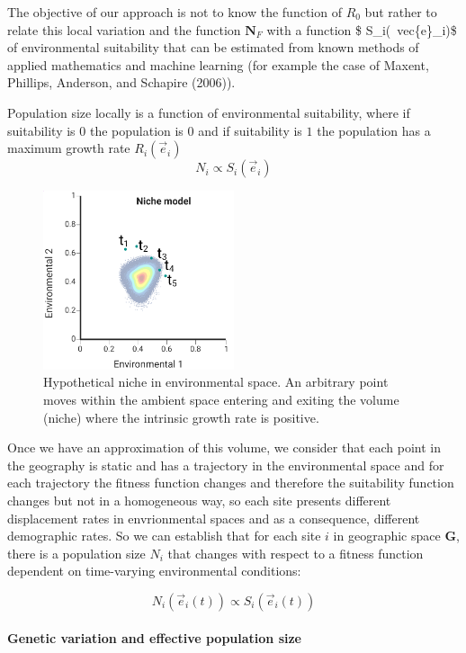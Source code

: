 \documentclass[
]{article}
\begin{document}
The objective of our approach is not to know the function of \(R_0\) but
rather to relate this local variation and the function \(\mathbf{N}_F\)
with a function \$ S\_i(~vec\{e\}\_i)\$ of environmental suitability
that can be estimated from known methods of applied mathematics and
machine learning (for example the case of Maxent, Phillips, Anderson,
and Schapire (2006)).

Population size locally is a function of environmental suitability,
where if suitability is \(0\) the population is \(0\) and if suitability
is \(1\) the population has a maximum growth rate \(R_i(\vec{e}_i)\) \[
N_i \propto  S_i(\vec{e}_i)
\]

\begin{figure}
\centering
\includegraphics[width=0.5\textwidth,height=\textheight]{all_figures/figure_1.png}
\caption{Hypothetical niche in environmental space. An arbitrary point
moves within the ambient space entering and exiting the volume (niche)
where the intrinsic growth rate is positive.}
\end{figure}

Once we have an approximation of this volume, we consider that each
point in the geography is static and has a trajectory in the
environmental space and for each trajectory the fitness function changes
and therefore the suitability function changes but not in a homogeneous
way, so each site presents different displacement rates in envrionmental
spaces and as a consequence, different demographic rates. So we can
establish that for each site \(i\) in geographic space \(\mathbf{G}\),
there is a population size \(N_i\) that changes with respect to a
fitness function dependent on time-varying environmental conditions:

\[
N_i(\vec{e}_i(t)) \propto  S_i(\vec{e}_i(t))
\]

\hypertarget{genetic-variation-and-effective-population-size}{%
\paragraph{Genetic variation and effective population
size}\label{genetic-variation-and-effective-population-size}}
\end{document}
